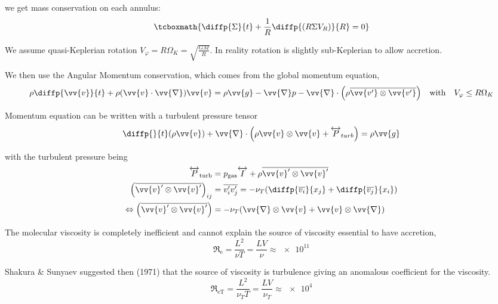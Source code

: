 \documentclass[10pt,a4paper,english,draft]{article}
\let\originalleft\left
\let\originalright\right
\renewcommand{\left}{\mathopen{}\mathclose\bgroup\originalleft}
\renewcommand{\right}{\aftergroup\egroup\originalright}
\begin{document}
we get mass conservation on each annulus:
\begin{equation}
    \label{eq:alpha_mass}
    \tcboxmath{
        \diffp{\Sigma}{t} + \frac{1}{R} \diffp{(R \Sigma V_R)}{R} = 0
    }
\end{equation}

We assume quasi-Keplerian rotation $V_\varphi = R \Omega_K = \sqrt{\frac{G
M}{R}}$. In reality rotation is slightly sub-Keplerian to allow accretion.

We then use the Angular Momentum conservation, which comes from the global
momentum equation,
\begin{equation*}
  \rho \diffp{\vv{v}}{t} + \rho (\vv{v}\cdot\vv{\nabla})\vv{v} =
  \rho \vv{g} - \vv{\nabla} p - \vv{\nabla}\cdot\left(\rho \overline{\vv{v'} \otimes \vv{v'}}\right) \quad \text{with} \quad V_\varphi \leq R \Omega_K
\end{equation*}

Momentum equation can be written with a turbulent pressure tensor
\begin{equation*}
  \diffp{}{t}(\rho \vv{v}) + \vv{\nabla}\cdot\left(\rho \vv{v} \otimes \vv{v} + \tens{P}_{turb}\right) = \rho \vv{g}
\end{equation*}


with the turbulent pressure being
\begin{align*}
    \tens{P}_\mathrm{turb} &= p_\mathrm{gas} \tens{I} + \rho \overline{\vv{v}' \otimes \vv{v}'} \\
    \left(\overline{\vv{v}' \otimes \vv{v}'}\right)_{ij} &= \overline{v_i' v_j'} =
    - \nu_T \left( \diffp{\overline{v_i}}{{x_j}} + \diffp{\overline{v_j}}{{x_i}} \right) \\
    \Leftrightarrow \left(\overline{\vv{v}' \otimes \vv{v}'}\right) &=
    - \nu_T \left(\vv{\nabla} \otimes \vv{v} + \vv{v} \otimes \vv{\nabla}\right)
\end{align*}


The molecular viscosity is completely inefficient and cannot explain the source
of viscosity essential to have accretion,
\begin{equation*}
    \mathfrak{R}_\mathrm{e} = \frac{L^2}{\nu T} = \frac{L V}{\nu} \approx \num{e11}
\end{equation*}

Shakura \& Sunyaev suggested then (1971) that the source of viscosity is
turbulence giving an anomalous coefficient for the viscosity.
\begin{equation*}
    \mathfrak{R}_\mathrm{eT} = \frac{L^2}{\nu_T T} = \frac{L V}{\nu_T} \approx \num{e4}
\end{equation*}
\end{document}
